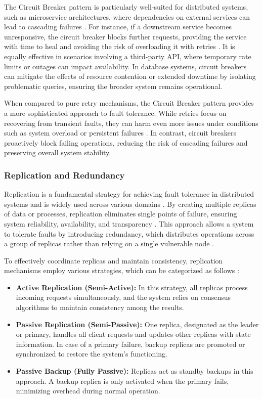 The Circuit Breaker pattern is particularly well-suited for distributed systems, such as microservice architectures, where dependencies on external services can lead to cascading failures \cite{fowler-circuit-breakers}. For instance, if a downstream service becomes unresponsive, the circuit breaker blocks further requests, providing the service with time to heal and avoiding the risk of overloading it with retries \cite{Vitillo2021}. It is equally effective in scenarios involving a third-party \gls{API}, where temporary rate limits or outages can impact availability. In database systems, circuit breakers can mitigate the effects of resource contention or extended downtime by isolating problematic queries, ensuring the broader system remains operational.

When compared to pure retry mechanisms, the Circuit Breaker pattern provides a more sophisticated approach to fault tolerance. While retries focus on recovering from transient faults, they can harm even more issues under conditions such as system overload or persistent failures \cite{Vitillo2021}. In contrast, circuit breakers proactively block failing operations, reducing the risk of cascading failures and preserving overall system stability.

\subsubsection{Replication and Redundancy}

Replication is a fundamental strategy for achieving fault tolerance in distributed systems and is widely used across various domains \cite{Sari2015}. By creating multiple replicas of data or processes, replication eliminates single points of failure, ensuring system reliability, availability, and transparency \cite{Coulouris2012}. This approach allows a system to tolerate faults by introducing redundancy, which distributes operations across a group of replicas rather than relying on a single vulnerable node \cite{Tanenbaum2023}.

To effectively coordinate replicas and maintain consistency, replication mechanisms employ various strategies, which can be categorized as follows \cite{Isukapalli2024}:

\begin{itemize}
    \item	\textbf{Active Replication (Semi-Active):} In this strategy, all replicas process incoming requests simultaneously, and the system relies on consensus algorithms to maintain consistency among the results.
    \item	\textbf{Passive Replication (Semi-Passive):} One replica, designated as the leader or primary, handles all client requests and updates other replicas with state information. In case of a primary failure, backup replicas are promoted or synchronized to restore the system’s functioning.
    \item	\textbf{Passive Backup (Fully Passive):} Replicas act as standby backups in this approach. A backup replica is only activated when the primary fails, minimizing overhead during normal operation.
\end{itemize}

